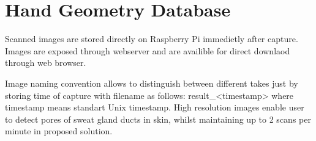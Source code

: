 \section{Hand Geometry Database}
\label{sec:db}
Scanned images are stored directly on Raspberry Pi immedietly after capture. Images are exposed
through webserver and are availible for direct downlaod through web browser.

Image naming convention allows to distinguish between different takes just by storing time of
capture with filename as follows: result\_<timestamp> where timestamp means standart Unix timestamp.
High resolution images enable user to detect pores of sweat gland ducts in skin, whilst maintaining
up to 2 scans per minute in proposed solution.